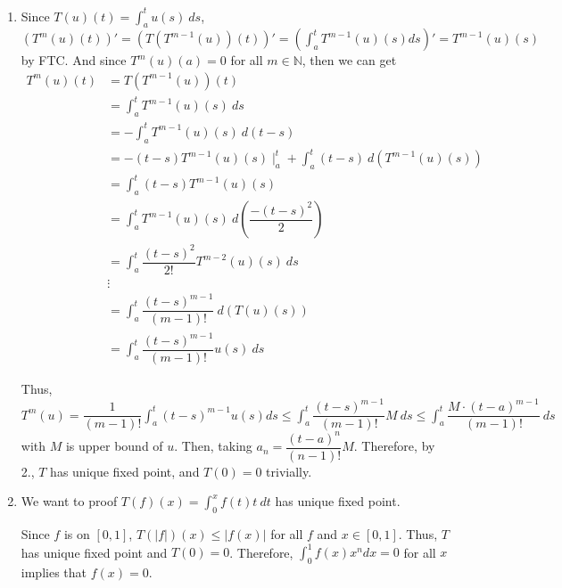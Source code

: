 \documentclass[12pt]{article}
\begin{document}
\begin{enumerate}
    \item Since $T(u)(t) = \displaystyle\int_a^t u(s)\ ds$, 
    $\left( T^m(u)(t)\right)' = \left( T(T^{m-1}(u))(t)\right)' = \left( \displaystyle\int_{a}^{t} T^{m-1}(u)(s) ds\right)' = T^{m-1}(u)(s)$ by FTC.
    And since $T^m(u)(a) = 0$ for all $m\in \mathbb{N}$,
    then we can get \begin{align*}
        T^{m}(u)(t) &= T(T^{m-1}(u))(t)\\
        &= \int_{a}^{t} T^{m-1}(u)(s)\ ds\\
        &= -\int_{a}^{t} T^{m-1}(u)(s)\ d(t-s)\\
        &= - (t-s) T^{m-1}(u)(s)\mid_a^t + \int_{a}^{t} (t-s)\ d(T^{m-1}(u)(s))\\
        &= \int_{a}^{t} (t-s)T^{m-1}(u)(s)\\
        &= \int_{a}^{t} T^{m-1}(u)(s)\ d(\dfrac{-(t-s)^2}{2})\\
        &= \int_{a}^{t} \dfrac{(t-s)^2}{2!} T^{m-2}(u)(s)\ ds\\
        &\vdots\\
        &= \int_{a}^{t} \dfrac{(t-s)^{m-1}}{(m-1)!} \ d(T(u)(s))\\
        &= \int_{a}^{t} \dfrac{(t-s)^{m-1}}{(m-1)!} u(s)\ ds
    \end{align*}

    Thus, $T^m(u) = \dfrac{1}{(m-1)!}\displaystyle\int_{a}^{t} (t-s)^{m-1} u(s) ds \leq \displaystyle\int_{a}^{t} \dfrac{(t-s)^{m-1}}{(m-1)!} M\ ds \leq \displaystyle\int_{a}^{t} \dfrac{M\cdot (t-a)^{m-1}}{(m-1)!}\ ds$
    with $M$ is upper bound of $u$. Then, taking $a_n = \dfrac{(t-a)^n}{(n-1)!}M$.
    Therefore, by 2., $T$ has unique fixed point, and $T(0) = 0$ trivially.

    \item We want to proof $T(f)(x) = \displaystyle\int_0^x f(t)t\ dt$ has unique fixed point.
    
    Since $f$ is on $[0, 1]$, $T(|f|)(x) \leq |f(x)|$ for all $f$ and $x\in [0, 1]$.
    Thus, $T$ has unique fixed point and $T(0) = 0$. 
    Therefore, $\int_{0}^{1} f(x) x^n dx = 0$ for all $x$ implies that $f(x) = 0$.
\end{enumerate}
\end{document}

